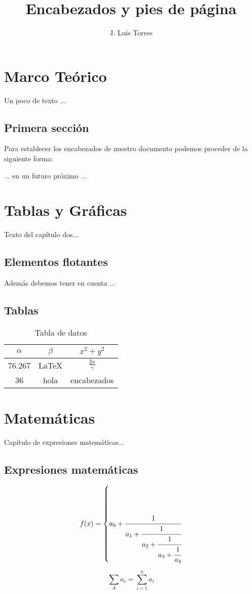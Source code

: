 \documentclass[letterpaper,12pt,twoside]{book}
\title{Encabezados y pies de página}
\author{J. Luis Torres}
\begin{document}

\maketitle
\thispagestyle{empty}

\chapter{Marco Teórico}
Un poco de texto ...

\newpage

\section{Primera sección}

Para establecer los encabezados de nuestro documento podemos proceder de la siguiente forma:

... en un futuro próximo ...


\chapter{Tablas y Gráficas}

Texto del capítulo dos...

\newpage

\section{Elementos flotantes}

Además debemos tener en cuenta ...

\newpage

\section{Tablas}

\begin{table}[h!]
	\centering
	\begin{tabular}{|c|c|c|}
		\hline 
		$\alpha$ & $\beta$ & $x^2+y^2$ \\ 
		\hline 
		76.267 & \LaTeX & $\frac{2x}{\gamma}$ \\ 
		\hline 
		36 & hola & encabezados \\ 
		\hline 
	\end{tabular} 
	\caption{Tabla de datos}
\end{table}

\chapter{Matemáticas}

Capítulo de expresiones matemáticas...

\newpage

\section{Expresiones matemáticas}

\[ f(x) = \left\{ a_0 + \cfrac{1}{a_1 + \cfrac{1}{a_2 + \cfrac{1}{a_3 + \cfrac{1}{a_4} } } } \right. \]

$$\sum_{A} a_i = \sum_{i=1}^n a_i $$
\end{document}
